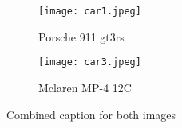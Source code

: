 \documentclass{article}
\begin{document}
	
	\begin{figure}
		\centering
		\begin{subfigure}{0.46\linewidth}  %
			\texttt{[image: car1.jpeg]}  %
			\caption{Porsche 911 gt3rs}  %
			\label{fig:subfig1}  %
		\end{subfigure}
		\hfill  %
		\begin{subfigure}{0.44\linewidth}  %
			\texttt{[image: car3.jpeg]}  %
			\caption{Mclaren MP-4 12C }  %
			\label{fig:subfig2}  %
		\end{subfigure}
		\caption{Combined caption for both images}  %
		\label{fig:subfigures}  %
	\end{figure}
	
\end{document}
